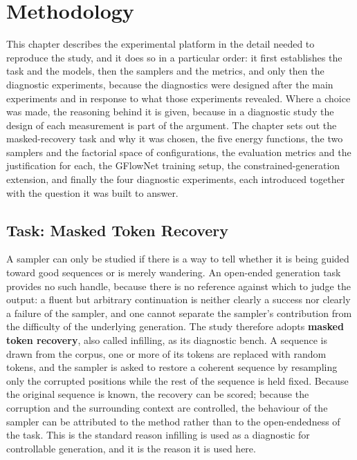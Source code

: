 \chapter{Methodology}
\label{ch:methodology}

This chapter describes the experimental platform in the detail needed to reproduce the study, and it does so in a particular order: it first establishes the task and the models, then the samplers and the metrics, and only then the diagnostic experiments, because the diagnostics were designed after the main experiments and in response to what those experiments revealed. Where a choice was made, the reasoning behind it is given, because in a diagnostic study the design of each measurement is part of the argument. The chapter sets out the masked-recovery task and why it was chosen, the five energy functions, the two samplers and the factorial space of configurations, the evaluation metrics and the justification for each, the GFlowNet training setup, the constrained-generation extension, and finally the four diagnostic experiments, each introduced together with the question it was built to answer.

\section{Task: Masked Token Recovery}
\label{sec:meth-task}

A sampler can only be studied if there is a way to tell whether it is being guided toward good sequences or is merely wandering. An open-ended generation task provides no such handle, because there is no reference against which to judge the output: a fluent but arbitrary continuation is neither clearly a success nor clearly a failure of the sampler, and one cannot separate the sampler's contribution from the difficulty of the underlying generation. The study therefore adopts \textbf{masked token recovery}, also called infilling, as its diagnostic bench. A sequence is drawn from the corpus, one or more of its tokens are replaced with random tokens, and the sampler is asked to restore a coherent sequence by resampling only the corrupted positions while the rest of the sequence is held fixed. Because the original sequence is known, the recovery can be scored; because the corruption and the surrounding context are controlled, the behaviour of the sampler can be attributed to the method rather than to the open-endedness of the task. This is the standard reason infilling is used as a diagnostic for controllable generation, and it is the reason it is used here.

